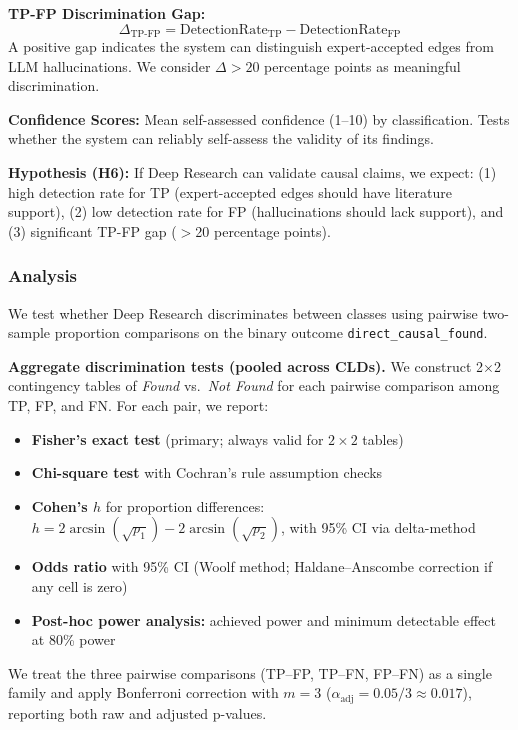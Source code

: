 \textbf{TP-FP Discrimination Gap:}
\[
\Delta_{\text{TP-FP}} = \text{DetectionRate}_{\text{TP}} - \text{DetectionRate}_{\text{FP}}
\]
A positive gap indicates the system can distinguish expert-accepted edges from LLM hallucinations. We consider $\Delta > 20$ percentage points as meaningful discrimination.

\textbf{Confidence Scores:} Mean self-assessed confidence (1--10) by classification. Tests whether the system can reliably self-assess the validity of its findings.

\textbf{Hypothesis (H6):} If Deep Research can validate causal claims, we expect: (1) high detection rate for TP (expert-accepted edges should have literature support), (2) low detection rate for FP (hallucinations should lack support), and (3) significant TP-FP gap ($>$20 percentage points).

\subsubsection{Analysis}

We test whether Deep Research discriminates between classes using pairwise two-sample proportion comparisons on the binary outcome \texttt{direct\_causal\_found}.

\textbf{Aggregate discrimination tests (pooled across CLDs).} We construct 2$\times$2 contingency tables of \textit{Found} vs.\ \textit{Not Found} for each pairwise comparison among TP, FP, and FN. For each pair, we report:
\begin{itemize}[noitemsep]
    \item \textbf{Fisher's exact test} (primary; always valid for $2\times 2$ tables)
    \item \textbf{Chi-square test} with Cochran's rule assumption checks
    \item \textbf{Cohen's $h$} for proportion differences: $h = 2\arcsin(\sqrt{p_1}) - 2\arcsin(\sqrt{p_2})$, with 95\% CI via delta-method
    \item \textbf{Odds ratio} with 95\% CI (Woolf method; Haldane--Anscombe correction if any cell is zero)
    \item \textbf{Post-hoc power analysis:} achieved power and minimum detectable effect at 80\% power
\end{itemize}
We treat the three pairwise comparisons (TP--FP, TP--FN, FP--FN) as a single family and apply Bonferroni correction with $m=3$ ($\alpha_{\text{adj}}=0.05/3 \approx 0.017$), reporting both raw and adjusted p-values.

